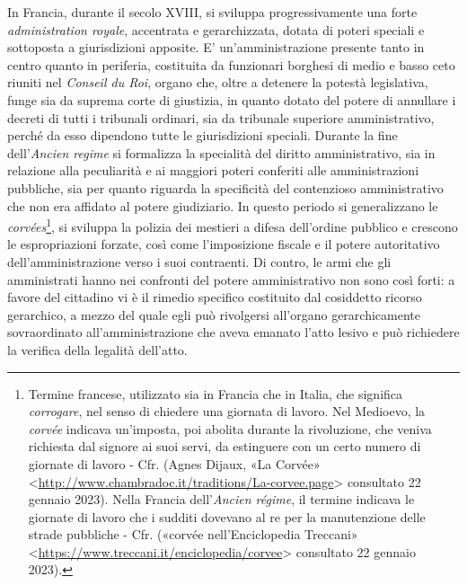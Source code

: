 \documentclass[12pt,it,a4paper,]{report}
\begin{document}
In Francia, durante il secolo XVIII, si sviluppa progressivamente una
forte \emph{administration royale}, accentrata e gerarchizzata, dotata
di poteri speciali e sottoposta a giurisdizioni apposite. E'
un'amministrazione presente tanto in centro quanto in periferia,
costituita da funzionari borghesi di medio e basso ceto riuniti nel
\emph{Conseil du Roi}, organo che, oltre a detenere la potestà
legislativa, funge sia da suprema corte di giustizia, in quanto dotato
del potere di annullare i decreti di tutti i tribunali ordinari, sia da
tribunale superiore amministrativo, perché da esso dipendono tutte le
giurisdizioni speciali. Durante la fine dell'\emph{Ancien regime} si
formalizza la specialità del diritto amministrativo, sia in relazione
alla peculiarità e ai maggiori poteri conferiti alle amministrazioni
pubbliche, sia per quanto riguarda la specificità del contenzioso
amministrativo che non era affidato al potere giudiziario. In questo
periodo si generalizzano le \emph{corvées}\footnote{Termine francese,
  utilizzato sia in Francia che in Italia, che significa
  \emph{corrogare}, nel senso di chiedere una giornata di lavoro. Nel
  Medioevo, la \emph{corvée} indicava un'imposta, poi abolita durante la
  rivoluzione, che veniva richiesta dal signore ai suoi servi, da
  estinguere con un certo numero di giornate di lavoro - Cfr. (Agnes
  Dijaux, {«La Corvée»}
  \textless{}\url{http://www.chambradoc.it/traditions/La-corvee.page}\textgreater{}
  consultato 22 gennaio 2023). Nella Francia dell'\emph{Ancien régime},
  il termine indicava le giornate di lavoro che i sudditi dovevano al re
  per la manutenzione delle strade pubbliche - Cfr. ({«corvée
  nell'Enciclopedia Treccani»}
  \textless{}\url{https://www.treccani.it/enciclopedia/corvee}\textgreater{}
  consultato 22 gennaio 2023).}, si sviluppa la polizia dei mestieri a
difesa dell'ordine pubblico e crescono le espropriazioni forzate, così
come l'imposizione fiscale e il potere autoritativo dell'amministrazione
verso i suoi contraenti. Di contro, le armi che gli amministrati hanno
nei confronti del potere amministrativo non sono così forti: a favore
del cittadino vi è il rimedio specifico costituito dal cosiddetto
ricorso gerarchico, a mezzo del quale egli può rivolgersi all'organo
gerarchicamente sovraordinato all'amministrazione che aveva emanato
l'atto lesivo e può richiedere la verifica della legalità dell'atto.
\end{document}

